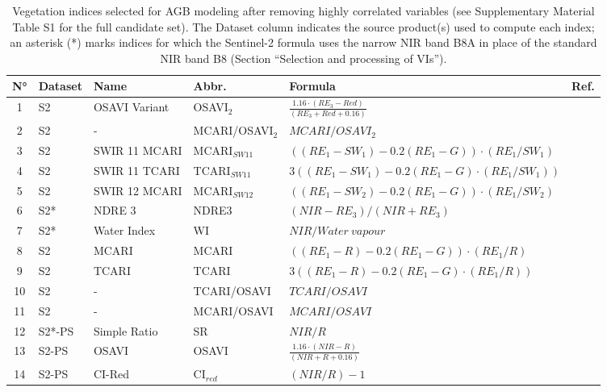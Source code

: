 \documentclass[
  english,
  review,
  number,
  sort,compress,
  authoryear,
  3p]{elsarticle}
\begin{document}
\begin{table}[!htbp]
\footnotesize %
\centering
\caption{Vegetation indices selected for AGB modeling after removing highly correlated variables (see Supplementary Material Table S1 for the full candidate set). The Dataset column indicates the source product(s) used to compute each index; an asterisk (*) marks indices for which the Sentinel-2 formula uses the narrow NIR band B8A in place of the standard NIR band B8 (Section ``Selection and processing of VIs'').}
\label{tbl-3}
\renewcommand{\arraystretch}{1.1} %
\begin{tabularx}{\textwidth}{@{} c l l l X l @{}}
\toprule
\textbf{N°} & \textbf{Dataset} & \textbf{Name} & \textbf{Abbr.} & \textbf{Formula} & \textbf{Ref.} \\
\midrule
1 & S2 & OSAVI Variant & OSAVI$_2$ & $\frac{1.16 \cdot (RE_3 - Red)}{(RE_3 + Red + 0.16)}$ & \cite{Jin2020} \\
2 & S2 & - & MCARI/OSAVI$_2$ & $MCARI/OSAVI_2$ & \cite{Wu2008} \\
3 & S2 & SWIR 11 MCARI & MCARI$_{SW11}$ & $((RE_1 - SW_1) - 0.2(RE_1 - G)) \cdot (RE_1/SW_1)$ & \cite{Herrmann2011} \\
4 & S2 & SWIR 11 TCARI & TCARI$_{SW11}$ & $3((RE_1 - SW_1) - 0.2(RE_1 - G) \cdot (RE_1/SW_1))$ & \cite{Herrmann2011} \\
5 & S2 & SWIR 12 MCARI & MCARI$_{SW12}$ & $((RE_1 - SW_2) - 0.2(RE_1 - G)) \cdot (RE_1/SW_2)$ & \cite{Herrmann2011} \\
6 & S2* & NDRE 3 & NDRE3 & $(NIR - RE_3)/(NIR + RE_3)$ & \cite{Magney2017} \\
7 & S2* & Water Index & WI & $NIR/Water\ vapour$ & \cite{Jin2020} \\
8 & S2 & MCARI & MCARI & $((RE_1 - R) - 0.2(RE_1 - G)) \cdot (RE_1/R)$ & \cite{Daughtry2000} \\
9 & S2 & TCARI & TCARI & $3((RE_1 - R) - 0.2(RE_1 - G) \cdot (RE_1/R))$ & \cite{Haboudane2002} \\
10 & S2 & - & TCARI/OSAVI & $TCARI/OSAVI$ & \cite{Haboudane2002} \\
11 & S2 & - & MCARI/OSAVI & $MCARI/OSAVI$ & \cite{Daughtry2000} \\
12 & S2*-PS & Simple Ratio & SR & $NIR/R$ & \cite{Tucker1979} \\
13 & S2-PS & OSAVI & OSAVI & $\frac{1.16 \cdot (NIR - R)}{(NIR + R + 0.16)}$ & \cite{Rondeaux1996} \\
14 & S2-PS & CI-Red & CI$_{red}$ & $(NIR/R) - 1$ & \cite{Clevers2013} \\

\end{tabularx}
\end{table}
\end{document}
